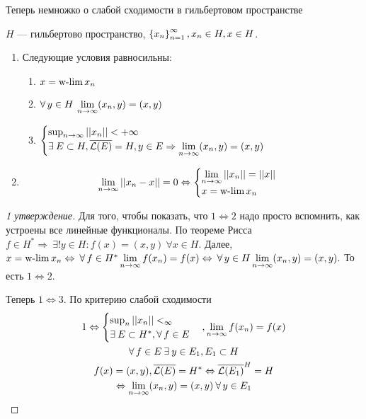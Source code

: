 \documentclass[document]{subfiles}
\begin{document}
Теперь немножко о слабой сходимости в гильбертовом пространстве

\begin{theorem}
    $H$ --- гильбертово пространство, $\left\{x_n\right\}^\infty_{n=1}, x_n \in H, x \in H$.
    \begin{enumerate}
        \item Следующие условия равносильны:
        \begin{enumerate}
            \item $x = \operatorname{w-lim} x_n$ 
            \item $\forall y \in H \: \liml_{n \to \infty} (x_n, y) = (x,y)$
            \item $\begin{cases}
                \sup_{n \to \infty} \norm{x_n} < +\infty \\
                \exists E \subset H, \overline{\calL(E)} = H, y \in E \Rightarrow \liml_{n \to \infty} (x_n, y) = (x,y)
            \end{cases}$
        \end{enumerate}
        \item \[\lim\limits_{n \to \infty} \left|\left| {x_n - x} \right| \right| = 0 \Leftrightarrow \begin{cases}
            \lim\limits_{n \to \infty} \left|\left| {x_n} \right| \right| = \left|\left| {x} \right| \right| \\
            x = \operatorname{w-lim} x_n
        \end{cases}  \]
    \end{enumerate}
\end{theorem}

\begin{proof}[1 утверждение]
    Для того, чтобы показать, что $1 \Leftrightarrow 2$ надо просто вспомнить, как устроены все линейные функционалы. 
    По теореме Рисса $f \in H^* \Rightarrow \: \exists! y \in H : f(x) = (x,y) \: \forall x \in H$. Далее,
    $x = \wlim x_n \Leftrightarrow \: \forall f \in H^* \liml_{n \to \infty} f(x_n) = f(x) \Leftrightarrow \: \forall y \in H \liml_{n \to \infty} (x_n,y) = (x,y).$
    То есть $1 \Leftrightarrow 2$. 

    Теперь $1 \Leftrightarrow 3$. По критерию слабой сходимости 
    \begin{gather*}
        1 \Leftrightarrow \begin{cases}
            \sup_n \norm{x_n} < _\infty \\
            \exists E \subset H^*, \forall f \in E
        \end{cases}, \liml_{n \to \infty} f(x_n) = f(x) \\
        \forall f \in E \: \exists y \in E_1, E_1 \subset H \\
        f(x) = (x,y), \overline{\calL(E)} = H^* \Leftrightarrow \overline{\calL(E_1)}^H = H \\
        \Leftrightarrow \liml_{n \to \infty} (x_n, y) = (x,y) \: \forall y \in E_1
    \end{gather*}
\end{proof}
\end{document}

